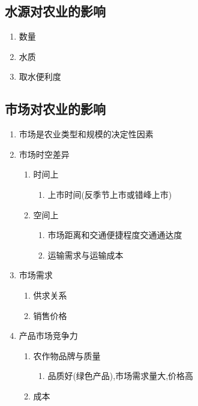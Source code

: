 \documentclass[a4paper]{article}
\begin{document}
    \subsection{水源对农业的影响}
    \begin{enumerate}
        \item 数量
        \item 水质
        \item 取水便利度
    \end{enumerate}
    \subsection{市场对农业的影响}
    \begin{enumerate}
        \item 市场是农业类型和规模的决定性因素
        \item 市场时空差异
        \begin{enumerate}
            \item 时间上
            \begin{enumerate}
                \item 上市时间(反季节上市或错峰上市)
            \end{enumerate}
            \item 空间上
            \begin{enumerate}
                \item 市场距离和交通便捷程度交通通达度
                \item 运输需求与运输成本
            \end{enumerate}
        \end{enumerate}
        \item 市场需求
        \begin{enumerate}
            \item 供求关系
            \item 销售价格
        \end{enumerate}
        \item 产品市场竞争力
        \begin{enumerate}
            \item 农作物品牌与质量
            \begin{enumerate}
                \item 品质好(绿色产品),市场需求量大,价格高
            \end{enumerate}
            \item 成本
            \begin{enumerate}

\end{enumerate}
\end{enumerate}
\end{enumerate}
\end{document}
